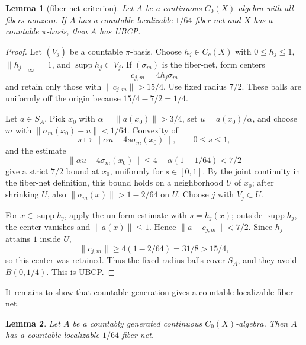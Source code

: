 \documentclass[11pt]{article}
\newtheorem{lemma}{Lemma}
\newcommand{\supp}{\operatorname{supp}}
\begin{document}
\begin{lemma}[fiber-net criterion]
\label{lem:fibernetcriterion}
Let \(A\) be a continuous \(C_0(X)\)-algebra with all fibers nonzero.  If \(A\)
has a countable localizable \(1/64\)-fiber-net and \(X\) has a countable
\(\pi\)-basis, then \(A\) has UBCP.
\end{lemma}

\begin{proof}
Let \((V_j)\) be a countable \(\pi\)-basis.  Choose
\(h_j\in C_c(X)\) with \(0\le h_j\le1\), \(\|h_j\|_\infty=1\), and
\(\supp h_j\subset V_j\).  If \((\sigma_m)\) is the fiber-net, form centers
\[
        c_{j,m}=4h_j\sigma_m
\]
and retain only those with \(\|c_{j,m}\|>15/4\).  Use fixed radius \(7/2\).
These balls are uniformly off the origin because \(15/4-7/2=1/4\).

Let \(a\in S_A\).  Pick \(x_0\) with \(\alpha=\|a(x_0)\|>3/4\), set
\(u=a(x_0)/\alpha\), and choose \(m\) with
\(\|\sigma_m(x_0)-u\|<1/64\).  Convexity of
\[
        s\mapsto \|\alpha u-4s\sigma_m(x_0)\|,
        \qquad 0\le s\le1,
\]
and the estimate
\[
        \|\alpha u-4\sigma_m(x_0)\|
        \le 4-\alpha(1-1/64)<7/2
\]
give a strict \(7/2\) bound at \(x_0\), uniformly for \(s\in[0,1]\).  By the
joint continuity in the fiber-net definition, this bound holds on a
neighborhood \(U\) of \(x_0\); after shrinking \(U\), also
\(\|\sigma_m(x)\|>1-2/64\) on \(U\).  Choose \(j\) with \(V_j\subset U\).

For \(x\in\supp h_j\), apply the uniform estimate with \(s=h_j(x)\); outside
\(\supp h_j\), the center vanishes and \(\|a(x)\|\le1\).  Hence
\(\|a-c_{j,m}\|<7/2\).  Since \(h_j\) attains \(1\) inside \(U\),
\[
        \|c_{j,m}\|\ge 4(1-2/64)=31/8>15/4,
\]
so this center was retained.  Thus the fixed-radius balls cover \(S_A\), and
they avoid \(B(0,1/4)\).  This is UBCP.
\end{proof}

It remains to show that countable generation gives a countable localizable
fiber-net.

\begin{lemma}
\label{lem:auto-net}
Let \(A\) be a countably generated continuous \(C_0(X)\)-algebra.  Then \(A\)
has a countable localizable \(1/64\)-fiber-net.
\end{lemma}
\end{document}
